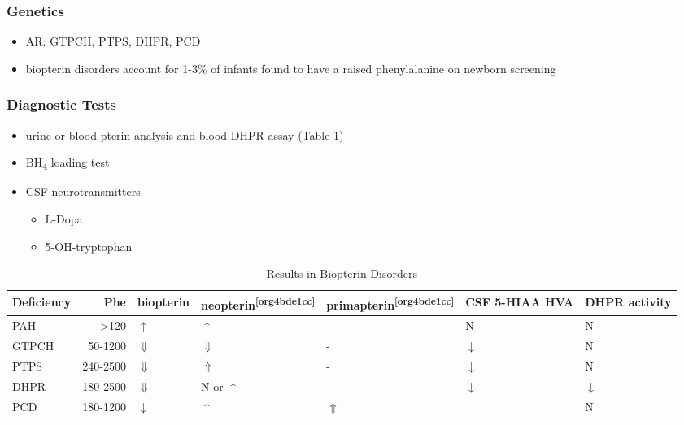 \documentclass{scrartcl}
\begin{document}
\subsubsection{Genetics}
\label{sec:orgdb66c3e}
\begin{itemize}
\item AR: GTPCH, PTPS, DHPR, PCD
\item biopterin disorders account for 1-3\% of infants found to have a
raised phenylalanine on newborn screening
\end{itemize}

\subsubsection{Diagnostic Tests}
\label{sec:orgd6cd438}
\begin{itemize}
\item urine or blood pterin analysis and blood DHPR assay (Table \ref{tab:orgbff2747})
\item BH\textsubscript{4} loading test
\item CSF neurotransmitters
\begin{itemize}
\item L-Dopa
\item 5-OH-tryptophan
\end{itemize}
\end{itemize}

\begin{table}[htbp]
\caption{\label{tab:orgbff2747}Results in Biopterin Disorders}
\centering
\begin{tabular}{lrlllll}
Deficiency & Phe & biopterin\footnotemark & neopterin\textsuperscript{\ref{org4bde1cc}} & primapterin\textsuperscript{\ref{org4bde1cc}} & CSF 5-HIAA HVA & DHPR activity\\
\hline
PAH & \textgreater{}120 & \(\uparrow\) & \(\uparrow\) & - & N & N\\
GTPCH & 50-1200 & \(\Downarrow\) & \(\Downarrow\) & - & \(\downarrow\) & N\\
PTPS & 240-2500 & \(\Downarrow\) & \(\Uparrow\) & - & \(\downarrow\) & N\\
DHPR & 180-2500 & \(\Downarrow\) & N or \(\uparrow\) & - & \(\downarrow\) & \(\downarrow\)\\
PCD & 180-1200 & \(\downarrow\) & \(\uparrow\) & \(\Uparrow\) &  & N\\
\end{tabular}
\end{table}
\end{document}

